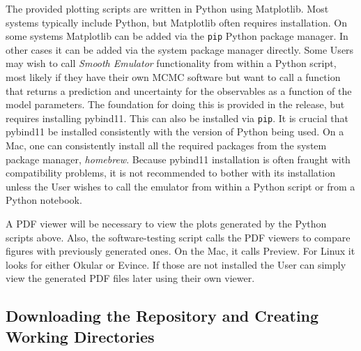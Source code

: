 \documentclass[UserManual.tex]{subfiles}
\begin{document}
The provided plotting scripts are written in Python using Matplotlib. Most systems typically include Python, but Matplotlib often requires installation. On some systems Matplotlib can be added via the {\tt pip} Python package manager. In other cases it can be added via the system package manager directly. Some Users may wish to call {\it Smooth Emulator} functionality from within a Python script, most likely if they have their own MCMC software but want to call a function that returns a prediction and uncertainty for the observables as a function of the model parameters. The foundation for doing this is provided in the release, but requires installing pybind11. This can also be installed via {\tt pip}. It is crucial that pybind11 be installed consistently with the version of Python being used. On a Mac, one can consistently install all the required packages from the system package manager, {\it homebrew}.
\vspace*{-8pt}{\tt
\begin{Verbatim}[commandchars=\\\{\}]
% \textcolor{darkred}{brew install python}
% \textcolor{darkred}{brew install numpy}
% \textcolor{darkred}{brew install python-matplotlib}
% \textcolor{darkred}{brew install pybind11}
\end{Verbatim}
}\vspace*{-8pt}
Because pybind11 installation is often fraught with compatibility problems, it is not recommended to bother with its installation unless the User wishes to call the emulator from within a Python script or from a Python notebook.

A PDF viewer will be necessary to view the plots generated by the Python scripts above. Also, the software-testing script calls the PDF viewers to compare figures with previously generated ones. On the Mac, it calls Preview. For Linux it looks for either Okular or Evince. If those are not installed the User can simply view the generated PDF files later using their own viewer.

\subsection{Downloading the Repository and Creating Working Directories}
\end{document}
